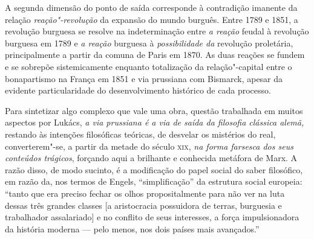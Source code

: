 A segunda dimensão do ponto de saída corresponde à contradição imanente
da relação \emph{reação"-revolução} da expansão do mundo burguês. Entre
1789 e 1851, a revolução burguesa se resolve na indeterminação entre
\emph{a reação} feudal à revolução burguesa em 1789 e \emph{a reação}
burguesa à \emph{possibilidade da} revolução proletária, principalmente
a partir da comuna de Paris em 1870. As duas reações se fundem e se
sobrepõe sistemicamente enquanto totalização da relação"-capital entre o
bonapartismo na França em 1851 e via prussiana com Bismarck, apesar da
evidente particularidade do desenvolvimento histórico de cada processo.

Para sintetizar algo complexo que vale uma obra, questão trabalhada em
muitos aspectos por Lukács, \emph{a via prussiana é a via de saída da
filosofia clássica alemã,} restando às intenções filosóficas teóricas,
de desvelar os mistérios do real, converterem"-se, a partir da metade do
século \textsc{xix}, \emph{na forma farsesca dos seus conteúdos trágicos},
forçando aqui a brilhante e conhecida metáfora de Marx. A razão disso,
de modo sucinto, é a modificação do papel social do saber filosófico, em
razão da, nos termos de Engels, ``simplificação'' da estrutura social
europeia: ``tanto que era preciso fechar os olhos propositalmente para
não ver na luta dessas três grandes classes {[}a aristocracia possuidora
de terras, burguesia e trabalhador assalariado{]} e no conflito de seus
interesses, a força impulsionadora da história moderna --- pelo menos, nos
dois países mais avançados.''

